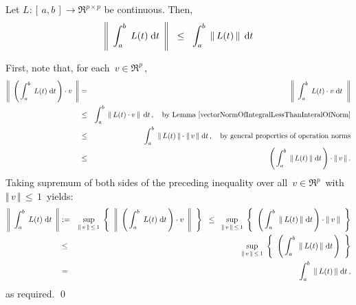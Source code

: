 
\vskip 0.5cm
\begin{proposition}\label{matrixNormOfIntegralLessThanInteralOfNorm}
\mbox{}
\vskip 0.1cm
\noindent
Let $L : [\,a,b\,] \longrightarrow \Re^{p \times p}$ be continuous.
Then,
\begin{equation*}
\left\Vert\;\, \int_{a}^{b}\; L(t) \;\textnormal{d} t \,\;\right\Vert
\;\; \leq \;\;
	\int_{a}^{b}\; \left\Vert\, L(t) \,\right\Vert \;\textnormal{d} t
\end{equation*}
\end{proposition}
\proof
First, note that, for each \,$v \in \Re^{p}$\,,
\begin{eqnarray*}
\left\Vert\;\, \left(\,\int_{a}^{b}\; L(t) \;\textnormal{d} t\,\right) \cdot v \,\;\right\Vert
& = &
	\left\Vert\;\, \int_{a}^{b}\; L(t) \cdot v \;\textnormal{d} t \;\;\right\Vert
\\
& \leq &
	\int_{a}^{b}\; \left\Vert\, L(t) \cdot v \,\right\Vert \;\textnormal{d} t\,,
	\quad
	\textnormal{by Lemma \ref{vectorNormOfIntegralLessThanInteralOfNorm}}
\\
& \leq &
	\int_{a}^{b}\; \Vert\, L(t) \,\Vert \cdot \Vert\, v \,\Vert \;\textnormal{d} t\,,
	\quad
	\textnormal{by general properties of operation norms}
\\
& \leq &
	\left(\, \int_{a}^{b}\; \Vert\, L(t) \,\Vert \;\textnormal{d} t \,\right)
	\cdot \Vert\, v \,\Vert\,.
\end{eqnarray*}
Taking supremum of both sides of the preceding inequality
over all \,$v \in \Re^{p}$\, with \,$\Vert\,v\,\Vert\,\leq\,1$\, yields:
\begin{eqnarray*}
\left\Vert\;\, \int_{a}^{b}\; L(t) \;\textnormal{d} t \,\;\right\Vert
& := &
	\underset{\Vert\,v\,\Vert \,\leq\, 1}{\sup}\;
	\left\{\;\;
		\left\Vert\;\, \left(\,\int_{a}^{b}\; L(t) \;\textnormal{d} t\,\right) \cdot v \,\;\right\Vert
		\;\;\right\}
\;\; \leq \;\;
	\underset{\Vert\,v\,\Vert \,\leq\, 1}{\sup}\;
	\left\{\;\;
		\left(\, \int_{a}^{b}\; \Vert\, L(t) \,\Vert \;\textnormal{d} t \,\right)
		\cdot \Vert\, v \,\Vert
		\;\;\right\}
\\
& \leq &
	\underset{\Vert\,v\,\Vert \,\leq\, 1}{\sup}\;
	\left\{\;\;
		\left(\, \int_{a}^{b}\; \Vert\, L(t) \,\Vert \;\textnormal{d} t \,\right)
		\;\;\right\}
\\
& = &
	\int_{a}^{b}\; \Vert\, L(t) \,\Vert \;\textnormal{d} t\,,
\end{eqnarray*} 
as required.
\qed


\renewcommand{\theenumi}{\roman{enumi}}
\renewcommand{\labelenumi}{\textnormal{(\theenumi)}$\;\;$}

